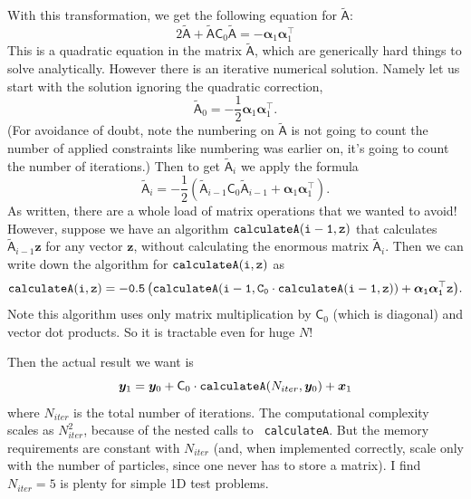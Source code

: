 \documentclass[11pt,a4paper,preprint]{aastex}
\newcommand{\bmath}[1]{\ensuremath{\bm{#1}}}
\renewcommand{\vec}[1]{\bmath{#1}}
\begin{document}
With this transformation, we get the following equation for $\tilde{\mathsf{A}}$:
\begin{equation}
2 \tilde{\mathsf{A}} + \tilde{\mathsf{A}} \mathsf{C}_0
\tilde{\mathsf{A}} = - \vec{\alpha}_1 \vec{\alpha}_1^{\top}
\end{equation}
This is a quadratic equation in the matrix $\tilde{\mathsf{A}}$, which
are generically hard things to solve analytically. However there is an
iterative numerical solution. Namely let us start with the solution
ignoring the quadratic correction,
\begin{equation}
\tilde{\mathsf{A}}_0 = -\frac{1}{2} \vec{\alpha}_1 \vec{\alpha}_1^{\top}\textrm{.}
\end{equation}
(For avoidance of doubt, note the numbering on $\tilde{\mathsf{A}}$ is
not going to count the number of applied constraints like numbering
was earlier on, it's going to count the number of iterations.) Then to
get $\tilde{\mathsf{A}}_{i}$ we apply the formula
\begin{equation}
\tilde{\mathsf{A}}_{i} = -\frac{1}{2} \left(\tilde{\mathsf{A}}_{i-1}
  \mathsf{C}_0 \tilde{\mathsf{A}}_{i-1} + \vec{\alpha}_1 \vec{\alpha}_1^{\top} \right)\textrm{.}
\end{equation}
As written, there are a whole load of matrix operations that we wanted
to avoid! However, suppose we have an algorithm ${\tt calculateA(i-1,z)}$
that calculates $\tilde{\mathsf{A}}_{i-1} \vec{z}$ for any vector
$\vec{z}$, without calculating the enormous matrix
$\tilde{\mathsf{A}}_i$. Then we can write down the algorithm for ${\tt
  calculateA(i,z)}$ as
\begin{equation}
{\tt calculateA(i,z) = -0.5 \left(calculateA(i-1, C_0 \cdot calculateA(i-1,
  z)) + \vec{\alpha}_1 \vec{\alpha}_1^{\top} \vec{z} \right)}\textrm{.}
\end{equation}
Note this algorithm uses only matrix multiplication by $\mathsf{C}_0$
(which is diagonal) and vector dot products. So it is tractable even
for huge $N$!

Then the actual result we want is
\begin{equation}
\vec{y}_1 = \vec{y}_0 + \mathsf{C}_0 \cdot {\tt
  calculateA}(N_{iter},\vec{y}_0) + \vec{x}_1
\end{equation}
where $N_{iter}$ is the total number of iterations. The computational
complexity scales as $N_{iter}^2$, because of the nested calls to {\tt
  calculateA}. But the memory requirements are constant with
$N_{iter}$ (and, when implemented correctly, scale only with the
number of particles, since one never has to store a matrix). I find
$N_{iter}=5$ is plenty for simple 1D test problems.
\end{document}
